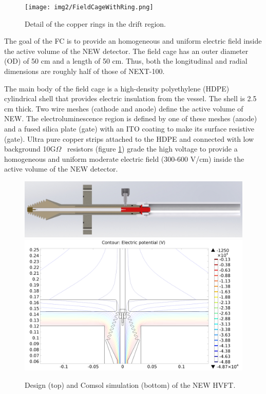 \begin{figure}[hpt!]
\centering
\texttt{[image: img2/FieldCageWithRing.png]}
\caption{Detail of the copper rings in the drift region.} \label{fig:drift1}
\end{figure}

The goal of the FC is to provide an homogeneous and uniform electric field inside the active volume of the NEW detector. The field cage has an outer diameter (OD) of 50 cm and a length of 50 cm. Thus, both the longitudinal and radial dimensions are roughly half of those of NEXT-100. 

The main body of the field cage is a high-density polyethylene (HDPE) cylindrical shell that provides electric insulation from the vessel. The shell is 2.5 cm thick. Two wire meshes (cathode and anode) define the active volume of NEW. The electroluminescence region is defined by one of these meshes (anode) and a fused silica plate (gate) with an ITO coating to make its surface resistive (gate). Ultra pure copper strips attached to the HDPE and connected with low background 
10G$\Omega$~ resistors (figure \ref{fig:drift1}) grade the high voltage to provide a homogeneous and uniform moderate electric field (300-600 V/cm) inside the active volume of the NEW detector.


\begin{figure}[hpt!]
\centering
\includegraphics[width=\textwidth]{img2/HVFT_full_image.png}
\includegraphics[width=\textwidth]{img2/HVFT_with_drift.png}
\caption{Design (top) and Comsol simulation (bottom) of the NEW HVFT.} \label{fig:hvft1}
\end{figure}


